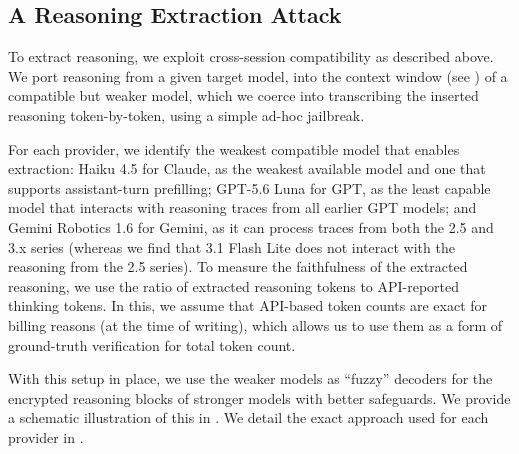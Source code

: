\begin{table}[h]
\centering
\caption{\textbf{Cross-model compatibility of encrypted reasoning.} As per July 2026. Row: the source model that produced the encrypted reasoning block; column: the target model receiving the injected reasoning. A \cmark \, indicates that, for this combination, the target model interacts with the injected thought.
\textbf{Claude:} the thinking traces of any model can be replayed by any other, except Fable 5's thoughts.
\textbf{GPT:} the GPT-5.6 series can replay the traces
of all earlier model generations. \textbf{Gemini:} the thinking traces of any model can
be replayed into any other.}
\label{tab:crossmodel}

\end{table}


\subsection{A Reasoning Extraction Attack}
\label{sec:extraction}

To extract reasoning, we exploit cross-session compatibility as described above. We port reasoning from a given target model, into the context window (see ) of a compatible but weaker model, which we coerce into transcribing the inserted reasoning token-by-token, using a simple ad-hoc jailbreak.

For each provider, we identify the weakest compatible model that enables extraction: Haiku 4.5 for Claude, as the weakest available model and one that supports assistant-turn prefilling; GPT-5.6 Luna for GPT, as the least capable model that interacts with reasoning traces from all earlier GPT models; and Gemini Robotics 1.6 for Gemini, as it can process traces from both the 2.5 and 3.x series (whereas we find that 3.1 Flash Lite does not interact with the reasoning from the 2.5 series). To measure the faithfulness of the extracted reasoning, we use the ratio of extracted reasoning tokens to API-reported thinking tokens. In this, we assume that API-based token counts are exact for billing reasons (at the time of writing), which allows us to use them as a form of ground-truth verification for total token count.

With this setup in place, we use the weaker models as ``fuzzy'' decoders for the encrypted reasoning blocks of stronger models with better safeguards. We provide a schematic illustration of this in . We detail the exact approach used
for each provider in .

